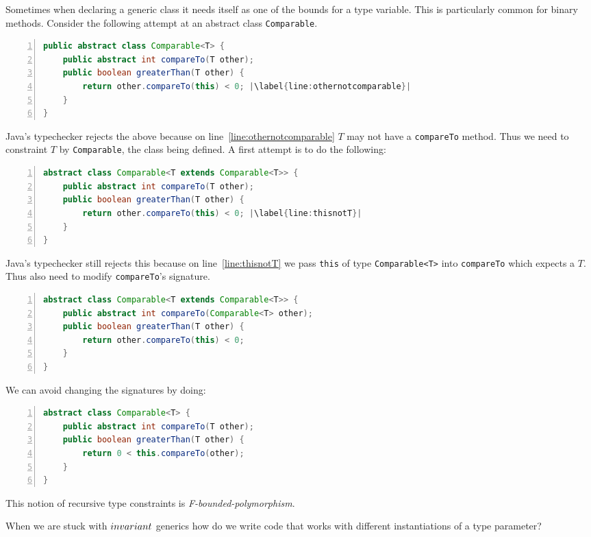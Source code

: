 \documentclass{article}
\begin{document}
\begin{example}
  Sometimes when declaring a generic class it needs itself as one of the bounds for a type variable.
  This is particularly common for binary methods.
  Consider the following attempt at an abstract class \texttt{Comparable}.
\begin{lstlisting}[escapechar=|, language=Java, numbers=left]
public abstract class Comparable<T> {
    public abstract int compareTo(T other);
    public boolean greaterThan(T other) {
        return other.compareTo(this) < 0; |\label{line:othernotcomparable}|
    }
}
\end{lstlisting}
  Java's typechecker rejects the above because on line~\ref{line:othernotcomparable} $T$ may not have a \texttt{compareTo} method.
  Thus we need to constraint $T$ by \texttt{Comparable}, the class being defined.
  A first attempt is to do the following:
\begin{lstlisting}[escapechar=|, language=Java, numbers=left]
abstract class Comparable<T extends Comparable<T>> {
    public abstract int compareTo(T other);
    public boolean greaterThan(T other) {
        return other.compareTo(this) < 0; |\label{line:thisnotT}|
    }
}
\end{lstlisting}
  Java's typechecker still rejects this because on line~\ref{line:thisnotT} we pass \texttt{this} of type \texttt{Comparable<T>} into \texttt{compareTo} which expects a $T$.
  Thus also need to modify \texttt{compareTo}'s signature.
\begin{lstlisting}[escapechar=|, language=Java, numbers=left]
abstract class Comparable<T extends Comparable<T>> {
    public abstract int compareTo(Comparable<T> other);
    public boolean greaterThan(T other) {
        return other.compareTo(this) < 0;
    }
}
\end{lstlisting}
  We can avoid changing the signatures by doing:
\begin{lstlisting}[escapechar=|, language=Java,numbers=left]
abstract class Comparable<T> {
    public abstract int compareTo(T other);
    public boolean greaterThan(T other) {
        return 0 < this.compareTo(other);
    }
}
\end{lstlisting}
  This notion of recursive type constraints is \textit{F-bounded-polymorphism}.
\end{example}

When we are stuck with $invariant{}$ generics how do we write code that works with different instantiations of a type parameter?
\end{document}
